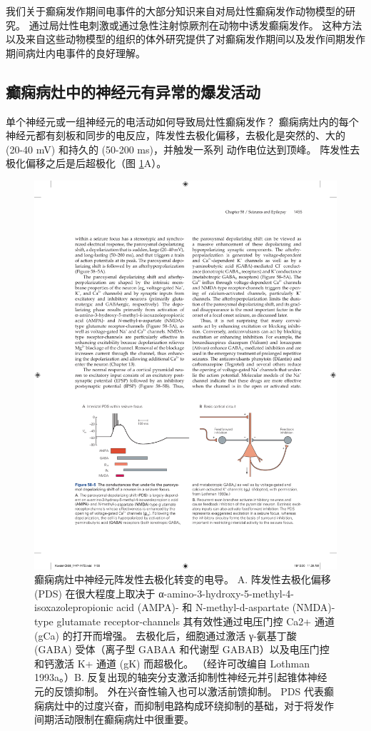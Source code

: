 我们关于癫痫发作期间电事件的大部分知识来自对局灶性癫痫发作动物模型的研究。
通过局灶性电刺激或通过急性注射惊厥剂在动物中诱发癫痫发作。
这种方法以及来自这些动物模型的组织的体外研究提供了对癫痫发作期间以及发作间期发作期间病灶内电事件的良好理解。



\subsection{癫痫病灶中的神经元有异常的爆发活动}

单个神经元或一组神经元的电活动如何导致局灶性癫痫发作？
癫痫病灶内的每个神经元都有刻板和同步的电反应，阵发性去极化偏移，去极化是突然的、大的 (20-40 mV) 和持久的 (50-200 ms)，并触发一系列 动作电位达到顶峰。
阵发性去极化偏移之后是后超极化（图 \ref{fig:58_5}A）。


\begin{figure}[htbp]
	\centering
	\includegraphics[width=0.9\linewidth]{chap58/fig_58_5}
	\caption{癫痫病灶中神经元阵发性去极化转变的电导。 A. 阵发性去极化偏移 (PDS) 在很大程度上取决于 α-amino-3-hydroxy-5-methyl-4-isoxazolepropionic acid (AMPA)- 和 N-methyl-d-aspartate (NMDA)-type glutamate receptor-channels 其有效性通过电压门控 Ca2+ 通道 (gCa) 的打开而增强。 去极化后，细胞通过激活 γ-氨基丁酸 (GABA) 受体（离子型 GABAA 和代谢型 GABAB）以及电压门控和钙激活 K+ 通道 (gK) 而超极化。 （经许可改编自 Lothman 1993a。）B. 反复出现的轴突分支激活抑制性神经元并引起锥体神经元的反馈抑制。 外在兴奋性输入也可以激活前馈抑制。 PDS 代表癫痫病灶中的过度兴奋，而抑制电路构成环绕抑制的基础，对于将发作间期活动限制在癫痫病灶中很重要。}
	\label{fig:58_5}
\end{figure}


